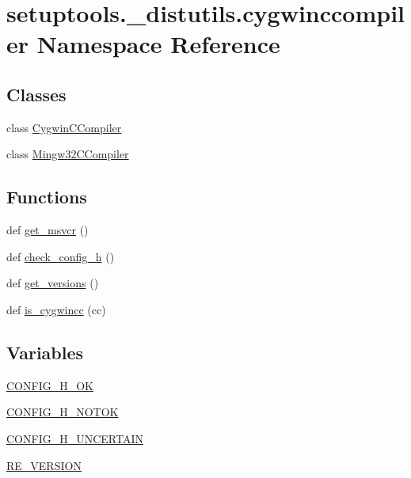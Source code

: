 \hypertarget{namespacesetuptools_1_1__distutils_1_1cygwinccompiler}{}\section{setuptools.\+\_\+distutils.\+cygwinccompiler Namespace Reference}
\label{namespacesetuptools_1_1__distutils_1_1cygwinccompiler}
\subsection*{Classes}
\begin{DoxyCompactItemize}
\item 
class \hyperlink{classsetuptools_1_1__distutils_1_1cygwinccompiler_1_1CygwinCCompiler}{Cygwin\+C\+Compiler}
\item 
class \hyperlink{classsetuptools_1_1__distutils_1_1cygwinccompiler_1_1Mingw32CCompiler}{Mingw32\+C\+Compiler}
\end{DoxyCompactItemize}
\subsection*{Functions}
\begin{DoxyCompactItemize}
\item 
def \hyperlink{namespacesetuptools_1_1__distutils_1_1cygwinccompiler_ade1ff0a9a8d625a0d03a2183a98808f0}{get\+\_\+msvcr} ()
\item 
def \hyperlink{namespacesetuptools_1_1__distutils_1_1cygwinccompiler_a463933b8a69aeb1a261c61ddcb1ba458}{check\+\_\+config\+\_\+h} ()
\item 
def \hyperlink{namespacesetuptools_1_1__distutils_1_1cygwinccompiler_a5a4e7c943f142f32d3769f62fdbae571}{get\+\_\+versions} ()
\item 
def \hyperlink{namespacesetuptools_1_1__distutils_1_1cygwinccompiler_aed4f1da3f7e9fe2673157d75fcd63bc3}{is\+\_\+cygwincc} (cc)
\end{DoxyCompactItemize}
\subsection*{Variables}
\begin{DoxyCompactItemize}
\item 
\hyperlink{namespacesetuptools_1_1__distutils_1_1cygwinccompiler_ae7d2d69118ffa27327eddd2c7bd122fa}{C\+O\+N\+F\+I\+G\+\_\+\+H\+\_\+\+OK}
\item 
\hyperlink{namespacesetuptools_1_1__distutils_1_1cygwinccompiler_ad47579f90d617a1a50b9ceb6554c9aba}{C\+O\+N\+F\+I\+G\+\_\+\+H\+\_\+\+N\+O\+T\+OK}
\item 
\hyperlink{namespacesetuptools_1_1__distutils_1_1cygwinccompiler_abc9d62a4bf5afc4e1240af4124335b88}{C\+O\+N\+F\+I\+G\+\_\+\+H\+\_\+\+U\+N\+C\+E\+R\+T\+A\+IN}
\item 
\hyperlink{namespacesetuptools_1_1__distutils_1_1cygwinccompiler_a2d7605c90b7ad1fa3641327c4e945b7b}{R\+E\+\_\+\+V\+E\+R\+S\+I\+ON}
\end{DoxyCompactItemize}


